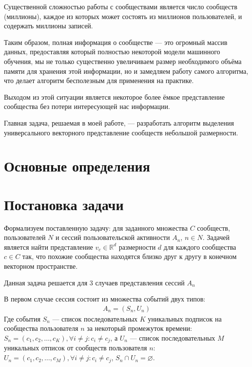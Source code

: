 \documentclass[times,specification,annotation]{itmo-student-thesis}
\begin{document}
Существенной сложностью работы с сообществами является число сообществ (миллионы), каждое из которых может состоять из миллионов пользователей, и содержать миллионы записей.  

Таким образом, полная информация о сообществе --- это огромный массив
данных, предоставляя который полностью некоторой модели машинного обучения,
мы не только существенно увеличиваем размер необходимого объёма памяти для хранения этой информации, но и замедляем работу самого алгоритма, что делает алгоритм бесполезным для применения на практике.

Выходом из этой ситуации является некоторое более ёмкое представление сообщества без потери интересующей нас информации.

Главная задача, решаемая в моей работе, --- разработать алгоритм выделения универсального векторного представление сообществ небольшой размерности. 

\section{Основные определения}



\section{Постановка задачи}\label{sec:intro}

Формализуем поставленную задачу: для заданного множества $C$ сообществ, пользователей $N$ и сессий пользовательской активности $A_n$, $n \in N$. Задачей является найти представление $v_{c} \in \mathbb{R}^d$ размерности $d$ для каждого сообщества $c \in C$ так, что похожие сообщества находятся близко друг к другу в конечном векторном пространстве. 

Данная задача решается для 3 случаев представления сессий $A_n$
 
В первом случае сессия состоит из множества событий двух типов:
 \begin{align}
A_n = (S_n, U_n) 
\label{eq-subs}
\end{align}
Где события $S_n$ --- список последовательных $K$ уникальных подписок на сообщества пользователя $n$ за некоторый промежуток времени: $S_n = (c_{1}, c_{2}, \dots, c_{K}), \forall i \ne j : c_i \ne c_j$, а $U_n$ --- список последовательных $M$ уникальных отписок от сообществ пользователя $n$: $U_n = (c_{1},  c_{2}, \dots, c_{M}), \forall i \ne j : c_i \ne c_j$, $S_n \cap U_n = \varnothing$.
\end{document}
